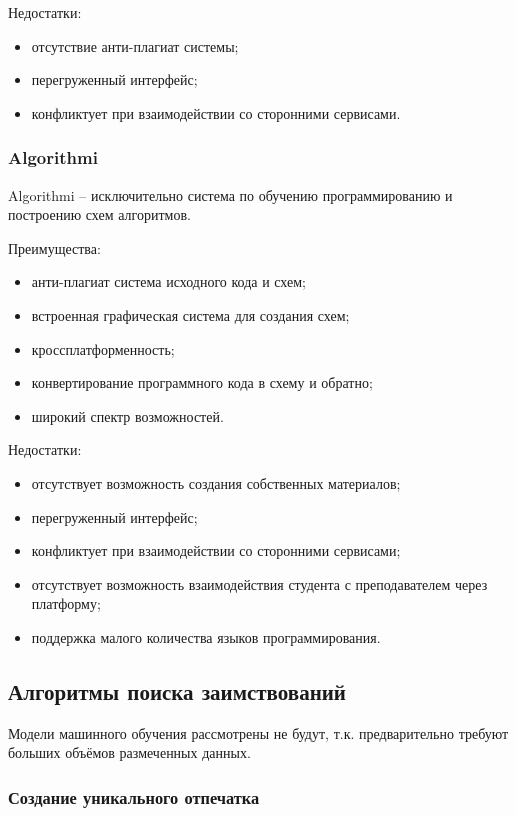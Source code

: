 Недостатки:
\begin{itemize}
	\item отсутствие анти-плагиат системы;
	\item перегруженный интерфейс;
	\item конфликтует при взаимодействии со сторонними сервисами.
\end{itemize}

\subsubsection{Algorithmi}

Algorithmi\cite{Algorithmi} -- исключительно система по обучению программированию и построению схем алгоритмов.

Преимущества:
\begin{itemize}
	\item анти-плагиат система исходного кода и схем;
	\item встроенная графическая система для создания схем;
	\item кроссплатформенность;
	\item конвертирование программного кода в схему и обратно;
	\item широкий спектр возможностей.
\end{itemize}

Недостатки:
\begin{itemize}
	\item отсутствует возможность создания собственных материалов;
	\item перегруженный интерфейс;
	\item конфликтует при взаимодействии со сторонними сервисами;
	\item отсутствует возможность взаимодействия студента с преподавателем через платформу;
	\item поддержка малого количества языков программирования.
\end{itemize}

\clearpage

\subsection{Алгоритмы поиска заимствований}

Модели машинного обучения рассмотрены не будут, т.к. предварительно требуют больших объёмов размеченных данных.

\subsubsection{Создание уникального отпечатка}

